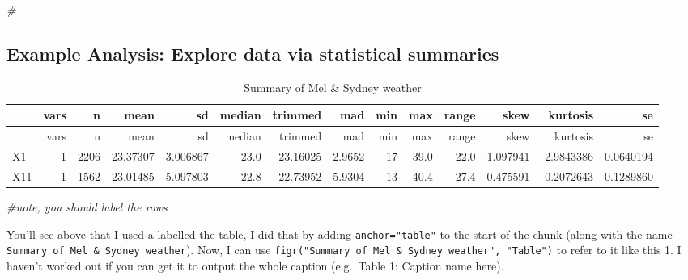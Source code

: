 \documentclass[
]{article}
\newenvironment{Shaded}{\begin{snugshade}}{\end{snugshade}}
\newcommand{\CommentTok}[1]{\textcolor[rgb]{0.56,0.35,0.01}{\textit{#1}}}
\newcommand{\DataTypeTok}[1]{\textcolor[rgb]{0.13,0.29,0.53}{#1}}
\newcommand{\KeywordTok}[1]{\textcolor[rgb]{0.13,0.29,0.53}{\textbf{#1}}}
\newcommand{\NormalTok}[1]{#1}
\newcommand{\OperatorTok}[1]{\textcolor[rgb]{0.81,0.36,0.00}{\textbf{#1}}}
\newcommand{\StringTok}[1]{\textcolor[rgb]{0.31,0.60,0.02}{#1}}
\begin{document}
\begin{Shaded}
\begin{Highlighting}[]
\CommentTok{#}
\end{Highlighting}
\end{Shaded}

\hypertarget{example-analysis-explore-data-via-statistical-summaries}{%
\subsection{Example Analysis: Explore data via statistical
summaries}\label{example-analysis-explore-data-via-statistical-summaries}}

\begin{Shaded}
\end{Shaded}

\begin{longtable}[]{@{}lrrrrrrrrrrrrr@{}}
\caption{Summary of Mel \& Sydney weather}\tabularnewline
\toprule
& vars & n & mean & sd & median & trimmed & mad & min & max & range &
skew & kurtosis & se\tabularnewline
\midrule
\endfirsthead
\toprule
& vars & n & mean & sd & median & trimmed & mad & min & max & range &
skew & kurtosis & se\tabularnewline
\midrule
\endhead
X1 & 1 & 2206 & 23.37307 & 3.006867 & 23.0 & 23.16025 & 2.9652 & 17 &
39.0 & 22.0 & 1.097941 & 2.9843386 & 0.0640194\tabularnewline
X11 & 1 & 1562 & 23.01485 & 5.097803 & 22.8 & 22.73952 & 5.9304 & 13 &
40.4 & 27.4 & 0.475591 & -0.2072643 & 0.1289860\tabularnewline
\bottomrule
\end{longtable}

\begin{Shaded}
\begin{Highlighting}[]
\CommentTok{#note, you should label the rows}
\end{Highlighting}
\end{Shaded}

You'll see above that I used a labelled the table, I did that by adding
\texttt{anchor="table"} to the start of the chunk (along with the name
\texttt{Summary\ of\ Mel\ \&\ Sydney\ weather}). Now, I can use
\texttt{figr("Summary\ of\ Mel\ \&\ Sydney\ weather",\ "Table")} to
refer to it like this 1. I haven't worked out if you can get it to
output the whole caption (e.g.~Table 1: Caption name here).
\end{document}

